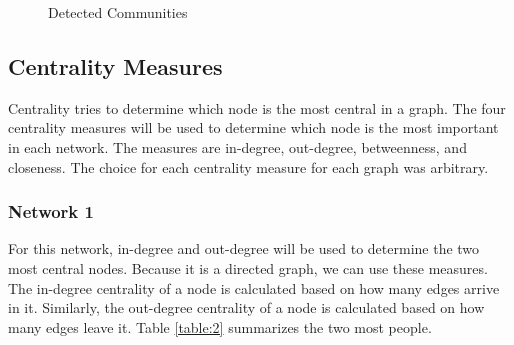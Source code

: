 \begin{figure}[t]
{{    \label{fig:comm_5}}}
    \qquad
    \caption{Detected Communities}
    \label{fig:5}
\end{figure}

\subsection{Centrality Measures}
Centrality tries to determine which node is the most central in a graph. The four centrality measures will be used to determine which node is the most important in each network. The measures are in-degree, out-degree, betweenness, and closeness. The choice for each centrality measure for each graph was arbitrary.

\subsubsection{Network 1}
For this network, in-degree and out-degree will be used to determine the two most central nodes. Because it is a directed graph, we can use these measures. The in-degree centrality of a node is calculated based on how many edges arrive in it. Similarly, the out-degree centrality of a node is calculated based on how many edges leave it. Table \ref{table:2} summarizes the two most people.
\begin{table}
    \centering
    \qquad
    \caption{Network 1 centrality}
    \label{table:2}
\end{table}


